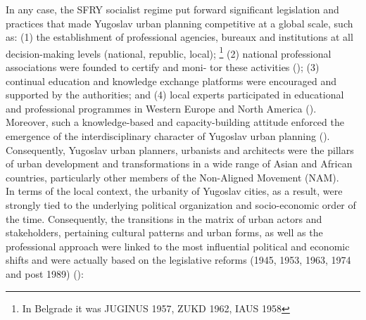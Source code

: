 \documentclass[11pt]{report}
\begin{document}
In any case, the SFRY socialist regime put forward significant legislation and practices that made Yugoslav urban planning competitive at a global scale, such as: (1) the establishment of professional agencies, bureaux and institutions at all decision-making levels (national, republic, local);
\footnote{In Belgrade it was JUGINUS 1957, ZUKD 1962, IAUS 1958}
(2) national professional associations were founded to certify and moni- tor these activities (\href{Bakic}{\citealt{bakic_prostorno_1988}}); (3) continual education and knowledge exchange platforms were encouraged and supported by the authorities; and (4) local experts participated in educational and professional programmes in Western Europe and North America (\href{Nedovic}{\citealt{nedovicbudic_waves_2006}}).
Moreover, such a knowledge-based and capacity-building attitude enforced the emergence of the interdisciplinary character of Yugoslav urban planning (\href{Cavric}{\citealt{cavric_perspectives_2000}}).
Consequently, Yugoslav urban planners, urbanists and architects were the pillars of urban development and transformations in a wide range of Asian and African countries, particularly other members of the Non-Aligned Movement (NAM).
\\

In terms of the local context, the urbanity of Yugoslav cities, as a result, were strongly tied to the underlying political organization and socio-economic order of the time. Consequently, the transitions in the matrix of urban actors and stakeholders, pertaining cultural patterns and urban forms, as well as the professional approach were linked to the most influential political and economic shifts and were actually based on the legislative reforms (1945, 1953, 1963, 1974 and post 1989) (\href{Pajovic}{\citealt{pajovic_pregled_2005}}):
\end{document}
